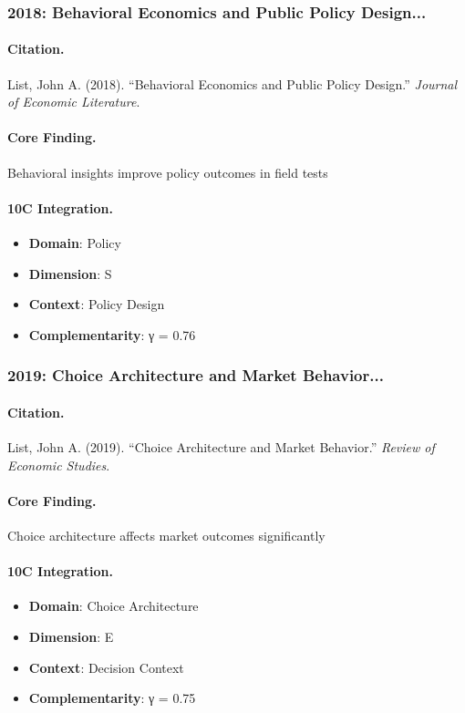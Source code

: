 \subsubsection{2018: Behavioral Economics and Public Policy Design...}

\paragraph{Citation.}
List, John A. (2018). ``Behavioral Economics and Public Policy Design.''
\textit{Journal of Economic Literature}.

\paragraph{Core Finding.}
Behavioral insights improve policy outcomes in field tests

\paragraph{10C Integration.}
\begin{itemize}[nosep]
  \item \textbf{Domain}: Policy
  \item \textbf{Dimension}: S
  \item \textbf{Context}: Policy Design
  \item \textbf{Complementarity}: γ = 0.76
\end{itemize}


\subsubsection{2019: Choice Architecture and Market Behavior...}

\paragraph{Citation.}
List, John A. (2019). ``Choice Architecture and Market Behavior.''
\textit{Review of Economic Studies}.

\paragraph{Core Finding.}
Choice architecture affects market outcomes significantly

\paragraph{10C Integration.}
\begin{itemize}[nosep]
  \item \textbf{Domain}: Choice Architecture
  \item \textbf{Dimension}: E
  \item \textbf{Context}: Decision Context
  \item \textbf{Complementarity}: γ = 0.75
\end{itemize}


